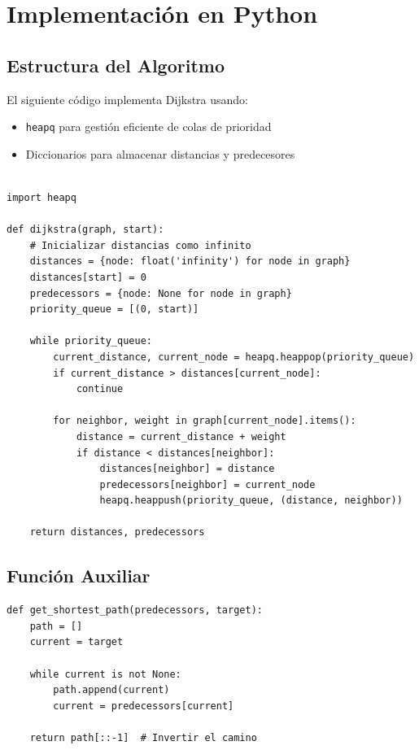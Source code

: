 \documentclass{article}
\begin{document}
\section{Implementación en Python}
\subsection{Estructura del Algoritmo}
El siguiente código implementa Dijkstra usando:
\begin{itemize}
    \item \texttt{heapq} para gestión eficiente de colas de prioridad
    \item Diccionarios para almacenar distancias y predecesores
\end{itemize}

\begin{lstlisting}[caption=Implementación del Algoritmo de Dijkstra]

import heapq

def dijkstra(graph, start):
    # Inicializar distancias como infinito
    distances = {node: float('infinity') for node in graph}
    distances[start] = 0
    predecessors = {node: None for node in graph}
    priority_queue = [(0, start)]
    
    while priority_queue:
        current_distance, current_node = heapq.heappop(priority_queue)
        if current_distance > distances[current_node]:
            continue
        
        for neighbor, weight in graph[current_node].items():
            distance = current_distance + weight
            if distance < distances[neighbor]:
                distances[neighbor] = distance
                predecessors[neighbor] = current_node
                heapq.heappush(priority_queue, (distance, neighbor))
    
    return distances, predecessors
\end{lstlisting}

\subsection{Función Auxiliar}
\begin{lstlisting}[caption=Reconstrucción del Camino Más Corto]
def get_shortest_path(predecessors, target):
    path = []
    current = target
    
    while current is not None:
        path.append(current)
        current = predecessors[current]
    
    return path[::-1]  # Invertir el camino
\end{lstlisting}
\end{document}
